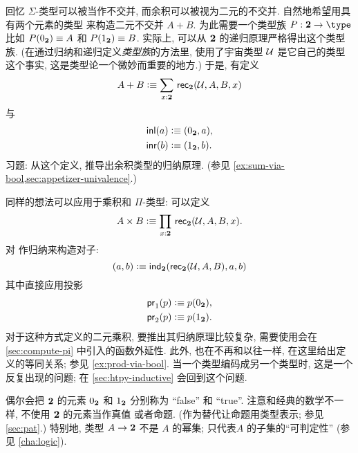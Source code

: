 回忆 $\Sigma$-类型可以被当作不交并, 而余积可以被视为二元的不交并.
自然地希望用具有两个元素的类型 \bool 来构造二元不交并 $A+B$.
为此需要一个类型族 $P:\bool\to\type$ 比如 $P({0_{\mathbf{2}}})\equiv A$ 和 $P({1_{\mathbf{2}}})\equiv B$.
实际上, 可以从 $\mathbf{2}$ 的递归原理严格得出这个类型族.
%
(在通过归纳和递归定义\emph{类型族}的方法里, 使用了宇宙类型 $\mathcal{U}$ 是它自己的类型这个事实, 这是类型论一个微妙而重要的地方.)
于是, 有定义
%
\[ A + B \defeq \sm{x:\bool} \rec{\bool}(\UU,A,B,x) \]
与
\begin{align*}
    {\mathsf{inl}}(a) &\vcentcolon\equiv ({0_{\mathbf{2}}},a), \\
    {\mathsf{inr}}(b) &\vcentcolon\equiv ({1_{\mathbf{2}}},b).
\end{align*}
习题: 从这个定义, 推导出余积类型的归纳原理.
(参见 \cref{ex:sum-via-bool,sec:appetizer-univalence}.)

同样的想法可以应用于乘积和 $\Pi$-类型: 可以定义
\[ A \times B \defeq \prd{x:\bool}\rec{\bool}(\UU,A,B,x). \]
对 \bool 作归纳来构造对子:
\[ (a,b) \vcentcolon\equiv \mathsf{ind}_{\mathbf{2}}(\mathsf{rec}_{\mathbf{2}}(\mathcal{U},A,B),a,b) \]
其中直接应用投影
\begin{align*}
    \mathsf{pr}_{1}(p) &\vcentcolon\equiv p({0_{\mathbf{2}}}), \\
    \mathsf{pr}_{2}(p) &\vcentcolon\equiv p({1_{\mathbf{2}}}).
\end{align*}
对于这种方式定义的二元乘积, 要推出其归纳原理比较复杂, 需要使用会在 \cref{sec:compute-pi} 中引入的函数外延性.
此外, 也在不再和以往一样, 在这里给出定义的等同关系;
参见 \cref{ex:prod-via-bool}.
当一个类型编码成另一个类型时, 这是一个反复出现的问题;
在 \cref{sec:htpy-inductive} 会回到这个问题.

偶尔会把 $\mathbf{2}$ 的元素 ${0_{\mathbf{2}}}$ 和 ${1_{\mathbf{2}}}$ 分别称为 ``false'' 和 ``true''.
注意和经典的数学不一样, 不使用 $\mathbf{2}$ 的元素当作真值%
%
或者命题.
(作为替代让命题用类型表示;
参见 \cref{sec:pat}.)
特别地, 类型 $A \to \mathbf{2}$ 不是 $A$ 的幂集; 只代表$A$ 的子集的``可判定性'' (参见 \cref{cha:logic}).
%

%